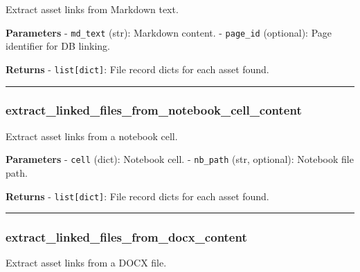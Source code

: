 Extract asset links from Markdown text.

\textbf{Parameters} - \texttt{md\_text} (str): Markdown content. -
\texttt{page\_id} (optional): Page identifier for DB linking.

\textbf{Returns} - \texttt{list{[}dict{]}}: File record dicts for each
asset found.

\begin{center}\rule{0.5\linewidth}{0.5pt}\end{center}

\subsubsection{extract\_linked\_files\_from\_notebook\_cell\_content}\label{extract_linked_files_from_notebook_cell_content}

\begin{Shaded}
\begin{Highlighting}[]
\OperatorTok{=}\NormalTok{)}
\end{Highlighting}
\end{Shaded}

Extract asset links from a notebook cell.

\textbf{Parameters} - \texttt{cell} (dict): Notebook cell. -
\texttt{nb\_path} (str, optional): Notebook file path.

\textbf{Returns} - \texttt{list{[}dict{]}}: File record dicts for each
asset found.

\begin{center}\rule{0.5\linewidth}{0.5pt}\end{center}

\subsubsection{extract\_linked\_files\_from\_docx\_content}\label{extract_linked_files_from_docx_content}

\begin{Shaded}
\begin{Highlighting}[]
\OperatorTok{=}\NormalTok{)}
\end{Highlighting}
\end{Shaded}

Extract asset links from a DOCX file.

